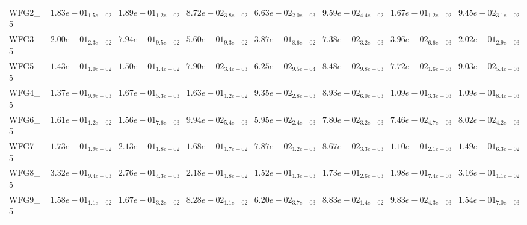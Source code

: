 \documentclass{article}
\begin{document}
\begin{table}
\begin{scriptsize}
\begin{tabular}{llllllll}
WFG2\_5 & $  1.83e-01_{ 1.5e-02}$ & $  1.89e-01_{ 1.2e-02}$ & \cellcolor{gray25}$  8.72e-02_{ 3.8e-02}$ & \cellcolor{gray95}$  6.63e-02_{ 2.0e-03}$ & $  9.59e-02_{ 4.4e-02}$ & $  1.67e-01_{ 1.2e-02}$ & $  9.45e-02_{ 3.1e-02}$ \\
WFG3\_5 & $  2.00e-01_{ 2.3e-02}$ & $  7.94e-01_{ 9.5e-02}$ & $  5.60e-01_{ 9.3e-02}$ & $  3.87e-01_{ 8.6e-02}$ & \cellcolor{gray25}$  7.38e-02_{ 3.2e-03}$ & \cellcolor{gray95}$  3.96e-02_{ 6.6e-03}$ & $  2.02e-01_{ 2.9e-03}$ \\
WFG5\_5 & $  1.43e-01_{ 1.0e-02}$ & $  1.50e-01_{ 1.4e-02}$ & $  7.90e-02_{ 3.4e-03}$ & \cellcolor{gray95}$  6.25e-02_{ 9.5e-04}$ & $  8.48e-02_{ 9.8e-03}$ & \cellcolor{gray25}$  7.72e-02_{ 1.6e-03}$ & $  9.03e-02_{ 5.4e-03}$ \\
WFG4\_5 & $  1.37e-01_{ 9.9e-03}$ & $  1.67e-01_{ 5.3e-03}$ & $  1.63e-01_{ 1.2e-02}$ & \cellcolor{gray25}$  9.35e-02_{ 2.8e-03}$ & \cellcolor{gray95}$  8.93e-02_{ 6.0e-03}$ & $  1.09e-01_{ 3.3e-03}$ & $  1.09e-01_{ 8.4e-03}$ \\
WFG6\_5 & $  1.61e-01_{ 1.2e-02}$ & $  1.56e-01_{ 7.6e-03}$ & $  9.94e-02_{ 5.4e-03}$ & \cellcolor{gray95}$  5.95e-02_{ 2.4e-03}$ & $  7.80e-02_{ 3.2e-03}$ & \cellcolor{gray25}$  7.46e-02_{ 4.7e-03}$ & $  8.02e-02_{ 4.2e-03}$ \\
WFG7\_5 & $  1.73e-01_{ 1.9e-02}$ & $  2.13e-01_{ 1.8e-02}$ & $  1.68e-01_{ 1.7e-02}$ & \cellcolor{gray95}$  7.87e-02_{ 1.2e-03}$ & \cellcolor{gray25}$  8.67e-02_{ 3.3e-03}$ & $  1.10e-01_{ 2.1e-03}$ & $  1.49e-01_{ 6.3e-02}$ \\
WFG8\_5 & $  3.32e-01_{ 9.4e-03}$ & $  2.76e-01_{ 4.3e-03}$ & $  2.18e-01_{ 1.8e-02}$ & \cellcolor{gray95}$  1.52e-01_{ 1.3e-03}$ & \cellcolor{gray25}$  1.73e-01_{ 2.6e-03}$ & $  1.98e-01_{ 7.4e-03}$ & $  3.16e-01_{ 1.1e-02}$ \\
WFG9\_5 & $  1.58e-01_{ 1.1e-02}$ & $  1.67e-01_{ 3.2e-02}$ & \cellcolor{gray25}$  8.28e-02_{ 1.1e-02}$ & \cellcolor{gray95}$  6.20e-02_{ 3.7e-03}$ & $  8.83e-02_{ 1.4e-02}$ & $  9.83e-02_{ 4.3e-03}$ & $  1.54e-01_{ 7.0e-03}$ \\
\hline
\end{tabular}
\end{scriptsize}
\end{table}
\end{document}
